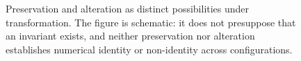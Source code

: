 \begin{figure}[htbp]

    \caption{Preservation and alteration as distinct possibilities under
    transformation. The figure is schematic: it does not
    presuppose that an invariant exists, and neither preservation
    nor alteration establishes numerical identity or non-identity
    across configurations.}
    \label{fig:invariance-and-transformation}
\end{figure}

